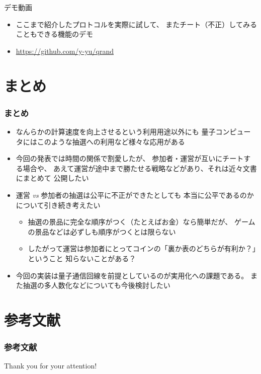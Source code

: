 \begin{frame}
  \centering
  {\Huge デモ動画}

  \begin{itemize}
    \item ここまで紹介したプロトコルを実際に試して、
    またチート（不正）してみることもできる機能のデモ
    
    \item \url{https://github.com/y-yu/qrand}%
  \end{itemize}
\end{frame}

\section{まとめ}

\begin{frame}
  \frametitle{まとめ}

  \pause
  \begin{itemize}
    \item<+-> なんらかの計算速度を向上させるという利用用途以外にも
    量子コンピュータにはこのような抽選への利用など様々な応用がある

    \item<+-> 今回の発表では時間の関係で割愛したが、
    参加者・運営が互いにチートする場合や、
    あえて運営が途中まで勝たせる戦略などがあり、それは近々文書にまとめて
    公開したい

    \item<+-> 運営 \textit{vs} 参加者の抽選は公平に不正ができたとしても
    本当に公平であるのかについて引き続き考えたい
    \begin{itemize}
      \item 抽選の景品に完全な順序がつく（たとえばお金）なら簡単だが、
      ゲームの景品などは必ずしも順序がつくとは限らない
      
      \item したがって運営は参加者にとってコインの「裏か表のどちらが有利か？」ということ
      知らないことがある？
    \end{itemize}
    
    \item<+-> 今回の実装は量子通信回線を前提としているのが実用化への課題である。
    また抽選の多人数化などについても今後検討したい
  \end{itemize}
\end{frame}

\section*{参考文献}

\begin{frame}[allowframebreaks]
  \frametitle{参考文献}

  
  
\end{frame}

\begin{frame}
  \centering
  {\Huge Thank you for your attention!}
\end{frame}


